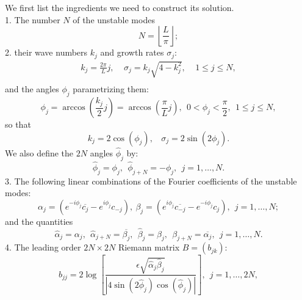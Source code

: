 \documentclass[12pt]{article}
\newcommand{\beq}{\begin{equation}}
\newcommand{\eeq}{\end{equation}}
\newcommand{\ba}{\begin{array}}
\newcommand{\ea}{\end{array}}
\begin{document}
  We first list the ingredients we need to construct its solution. \\
1. The number $N$ of the unstable modes
\beq\label{eq:generic2}
N = \left\lfloor \frac{L}{\pi} \right\rfloor ;
\end{equation}
2. their wave numbers $k_j$ and growth rates $\sigma_j$:
\beq\label{eq:wave_numbers}
\ba{l}
k_j=\frac{2\pi}{L}j, \ \ \ \ \ \sigma_j=k_j\sqrt{4-k_j^2}, \ \ \ \ \ 1\le j \le N, \\
\ea
\end{equation}
and the angles $\phi_j$ parametrizing them:
\beq
\phi_j=\arccos\left(\frac{k_j}{2}j \right)=\arccos\left(\frac{\pi}{L}j \right), \ \ 0 < \phi_j < \frac{\pi}{2}, \ \ 1\le j \le N,
\eeq
so that
\beq
k_j = 2 \cos(\phi_j), \ \ \ \ \sigma_j = 2 \sin(2\phi_j).
\eeq
We also define the $2N$ angles $\hat\phi_j$ by:
\begin{equation}
\label{eq:anglesb}
\hat\phi_j=\phi_j, \ \ \hat\phi_{j+N}=-\phi_j, \ \ j=1,\ldots,N.
\end{equation}
3. The following linear combinations of the Fourier coefficients of the unstable modes:
\beq\label{def_alpha_beta}
\alpha_j= (e^{-i\phi_j} \overline{c_j}-e^{i\phi_j}c_{-j}), \ \beta_j= (e^{i\phi_j} \overline{c_{-j}}-e^{-i\phi_j}c_{j}), \ \ j=1,\ldots,N ;
\eeq
and the quantities
\beq\label{def_hat_alpha_beta}
\hat\alpha_j=\alpha_j, \ \ \hat\alpha_{j+N}=\overline{\beta_j},  \ \  \hat\beta_j=\beta_j, \ \ \beta_{j+N} = \overline{\alpha_j}, \ \ j=1,\ldots,N .
\eeq
4. The leading order $2N\times 2N$ Riemann matrix $B=(b_{jk})$:
\begin{equation}
\label{eq:riemann1}
b_{jj}= 2 \log\left[ \frac{\epsilon \sqrt{\hat\alpha_j\hat\beta_j}}{|4\sin(2\hat\phi_j)\cos(\hat\phi_j) |} \right], \ \ j=1,\ldots,2N,
\end{equation}
\end{document}
